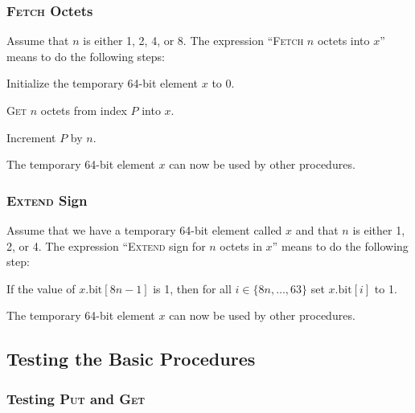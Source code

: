 \documentclass[a4paper,12pt]{article}
\newcommand{\PC}{P}
\newcommand{\bitno}[2]{#1.\mathrm{bit}[#2]}
\newcommand{\range}[2]{\{#1,\ldots,#2\}}
\newcommand{\proc}[1]{\textsc{#1}}
\begin{document}
\subsubsection{\proc{Fetch} Octets}

Assume that $n$ is either 1, 2, 4, or 8.
The expression ``\proc{Fetch} $n$ octets into $x$'' means to do the following steps:
\begin{stepnumbers}
\item Initialize the temporary 64-bit element $x$ to 0.
\item \proc{Get} $n$ octets from index $\PC$ into $x$.
\item Increment $\PC$ by $n$.
\end{stepnumbers}
The temporary 64-bit element $x$ can now be used by other procedures.

\subsubsection{\proc{Extend} Sign}

Assume that we have a temporary 64-bit element called $x$ and that $n$ is either 1, 2, or 4.
The expression ``\proc{Extend} sign for $n$ octets in $x$'' means to do the following step:
\begin{stepnumbers}
\item If the value of $\bitno{x}{8n-1}$ is 1, then for all $i \in \range{8n}{63}$ set $\bitno{x}{i}$ to 1.
\end{stepnumbers}
The temporary 64-bit element $x$ can now be used by other procedures.

\subsection{Testing the Basic Procedures}

\subsubsection{Testing \proc{Put} and \proc{Get}}
\end{document}
